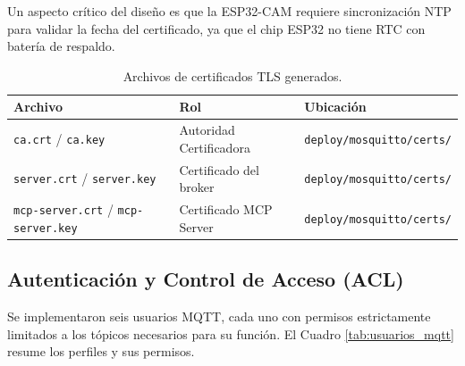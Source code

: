 \documentclass[12pt,letterpaper]{article}
\begin{document}
Un aspecto crítico del diseño es que la ESP32-CAM requiere sincronización NTP para validar la fecha del certificado, ya que el chip ESP32 no tiene RTC con batería de respaldo.

\begin{table}[H]
    \centering
    \caption{Archivos de certificados TLS generados.}
    \label{tab:certificados}
    \begin{tabular}{lll}
        \toprule
        \textbf{Archivo} & \textbf{Rol} & \textbf{Ubicación} \\
        \midrule
        \mbox{\texttt{ca.crt}} / \mbox{\texttt{ca.key}} & Autoridad Certificadora & \mbox{\texttt{deploy/mosquitto/certs/}} \\
        \mbox{\texttt{server.crt}} / \mbox{\texttt{server.key}} & Certificado del broker & \mbox{\texttt{deploy/mosquitto/certs/}} \\
        \mbox{\texttt{mcp-server.crt}} / \mbox{\texttt{mcp-server.key}} & Certificado MCP Server & \mbox{\texttt{deploy/mosquitto/certs/}} \\
        \bottomrule
    \end{tabular}
\end{table}

\bigskip
\subsection{Autenticación y Control de Acceso (ACL)}

Se implementaron seis usuarios MQTT, cada uno con permisos estrictamente limitados a los tópicos necesarios para su función. El Cuadro \ref{tab:usuarios_mqtt} resume los perfiles y sus permisos.
\end{document}

